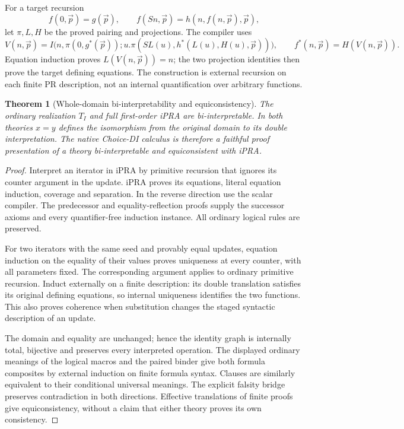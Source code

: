 \documentclass[11pt,letterpaper]{article}
\newtheorem{theorem}{Theorem}[section]
\theoremstyle{definition}\newtheorem{definition}[theorem]{Definition}
\theoremstyle{remark}\newtheorem{remark}[theorem]{Remark}
\begin{document}
For a target recursion
\[
f(0,\vec p)=g(\vec p),\qquad
f(Sn,\vec p)=h(n,f(n,\vec p),\vec p),
\]
let $\pi,L,H$ be the proved pairing and projections. The compiler uses
\[
V(n,\vec p)=I\bigl(n,\pi(0,g^*(\vec p));
u.\pi(SL(u),h^*(L(u),H(u),\vec p))\bigr),
\qquad f^*(n,\vec p)=H(V(n,\vec p)).
\]
Equation induction proves $L(V(n,\vec p))=n$; the two projection
identities then prove the target defining equations. The construction
is external recursion on each finite PR description, not an internal
quantification over arbitrary functions.

\begin{theorem}[Whole-domain bi-interpretability and equiconsistency]
The ordinary realization $T_I$ and full first-order iPRA are
bi-interpretable. In both theories $x=y$ defines the isomorphism from
the original domain to its double interpretation. The native Choice-DI
calculus is therefore a faithful proof presentation of a theory
bi-interpretable and equiconsistent with iPRA.
\end{theorem}
\begin{proof}
Interpret an iterator in iPRA by primitive recursion that ignores its
counter argument in the update. iPRA proves its equations, literal
equation induction, coverage and separation. In the reverse direction
use the scalar compiler. The predecessor and equality-reflection proofs
supply the successor axioms and every quantifier-free induction instance.
All ordinary logical rules are preserved.

For two iterators with the same seed and provably equal updates,
equation induction on the equality of their values proves uniqueness at
every counter, with all parameters fixed. The corresponding argument
applies to ordinary primitive recursion. Induct externally on a finite
description: its double translation satisfies its original defining
equations, so internal uniqueness identifies the two functions. This
also proves coherence when substitution changes the staged syntactic
description of an update.

The domain and equality are unchanged; hence the identity graph is
internally total, bijective and preserves every interpreted operation.
The displayed ordinary meanings of the logical macros and the paired
binder give both formula composites by external induction on finite
formula syntax. Clauses are similarly equivalent to their conditional
universal meanings. The explicit falsity bridge preserves contradiction
in both directions. Effective translations of finite proofs give
equiconsistency, without a claim that either theory proves its own
consistency.
\end{proof}
\end{document}
